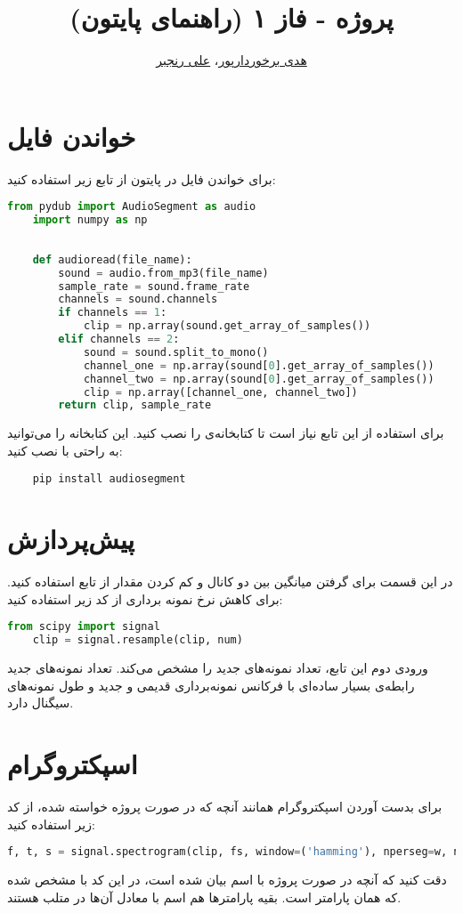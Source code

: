 \documentclass{utsignal}
\title{پروژه - فاز ۱ (راهنمای پایتون)}
\author{\href{mailto:h.barkhordarpour@ut.ac.ir?subject=[SS\%20S98 A2]}{هدی برخوردارپور}، 
\href{mailto:ranjbar.ali@ut.ac.ir?subject=[SS\%20S98 A2]\%20}{علی رنجبر}}
\begin{document}
	\maketitle
	\section*{خواندن فایل }
	برای خواندن فایل  در پایتون از تابع زیر استفاده کنید:
	\begin{latin}
		\begin{lstlisting}[language=Python]
	from pydub import AudioSegment as audio 
	import numpy as np 
	
	
	def audioread(file_name):
		sound = audio.from_mp3(file_name)
		sample_rate = sound.frame_rate
		channels = sound.channels
		if channels == 1:
			clip = np.array(sound.get_array_of_samples())
		elif channels == 2:
			sound = sound.split_to_mono()
			channel_one = np.array(sound[0].get_array_of_samples())
			channel_two = np.array(sound[0].get_array_of_samples())
			clip = np.array([channel_one, channel_two])
		return clip, sample_rate\end{lstlisting}
	\end{latin}
	برای استفاده از این تابع نیاز است تا کتابخانه‌ی  را نصب کنید. این کتابخانه را می‌توانید به راحتی با  نصب کنید:
	\begin{latin}
		\begin{lstlisting}
	pip install audiosegment\end{lstlisting}
	\end{latin}

	\section*{پیش‌پردازش}
	در این قسمت برای گرفتن میانگین بین دو کانال و کم کردن مقدار  از تابع 	 استفاده کنید. برای کاهش نرخ نمونه برداری از کد زیر استفاده کنید:
	\begin{latin}
		\begin{lstlisting}[language=Python]
	from scipy import signal 
	clip = signal.resample(clip, num)\end{lstlisting}
	\end{latin}
	ورودی دوم این تابع، تعداد نمونه‌های جدید را مشخص می‌کند. تعداد نمونه‌های جدید رابطه‌ی بسیار ساده‌ای با فرکانس نمونه‌برداری قدیمی و جدید و طول نمونه‌های سیگنال دارد.
	\section*{اسپکتروگرام} \label{ssec:spectrogram}
	برای بدست آوردن اسپکتروگرام همانند آنچه که در صورت پروژه خواسته شده، از کد زیر استفاده کنید:
	\begin{latin}
		\begin{lstlisting}[language=Python]
	f, t, s = signal.spectrogram(clip, fs, window=('hamming'), nperseg=w, noverlap=noverlap, nfft=nfft)\end{lstlisting}
	\end{latin}
	دقت کنید که آنچه در صورت پروژه با اسم  بیان شده است، در این کد با  مشخص شده که همان پارامتر  است. بقیه پارامتر‌ها هم اسم با معادل آن‌ها در متلب هستند.
	
\end{document}
